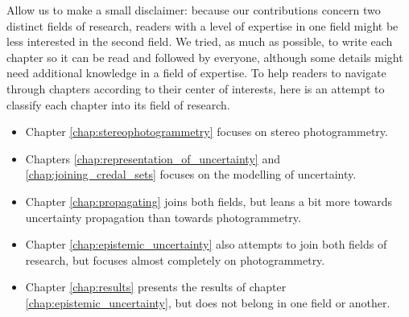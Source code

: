 Allow us to make a small disclaimer: because our contributions concern two distinct fields of research, readers with a level of expertise in one field might be less interested in the second field. We tried, as much as possible, to write each chapter so it can be read and followed by everyone, although some details might need additional knowledge in a field of expertise. To help readers to navigate through chapters according to their center of interests, here is an attempt to classify each chapter into its field of research.
\begin{itemize}
    \item Chapter \ref{chap:stereophotogrammetry} focuses on stereo photogrammetry.
    \item Chapters \ref{chap:representation_of_uncertainty} and \ref{chap:joining_credal_sets} focuses on the modelling of uncertainty.
    \item Chapter \ref{chap:propagating} joins both fields, but leans a bit more towards uncertainty propagation than towards photogrammetry. 
    \item Chapter \ref{chap:epistemic_uncertainty} also attempts to join both fields of research, but focuses almost completely on photogrammetry.
    \item Chapter \ref{chap:results} presents the results of chapter \ref{chap:epistemic_uncertainty}, but does not belong in one field or another.
\end{itemize}

